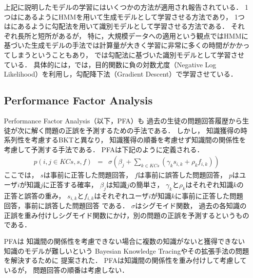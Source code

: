 上記に説明したモデルの学習にはいくつかの方法が適用され報告されている．
1つは\cite{corbett1994knowledge}にあるようにHMMを用いて生成モデルとして学習させる方法であり，
1つは\cite{yudelson2013individualized}にあるように勾配法を用いて識別モデルとして学習させる方法である．
それぞれ長所と短所があるが，
特に，大規模データへの適用という観点ではHMMに基づいた生成モデルの手法では計算量が大きく学習に非常に多くの時間がかかってしまうということもあり，
\cite{yudelson2013individualized}では勾配法に基づいた識別モデルとして学習させている．
具体的には，\cite{yudelson2013individualized}では，目的関数に負の対数尤度（Negative Log Likelihood）を利用し，勾配降下法（Gradient Descent）で学習させている．



\subsection{Performance Factor Analysis}
Performance Factor Analysis\cite{pavlik2009performance}（以下，PFA）も
過去の生徒の問題回答履歴から生徒が次に解く問題の正誤を予測するための手法である．
しかし，
知識獲得の時系列性を考慮するBKTと異なり，
知識獲得の順番を考慮せず知識間の関係性を考慮して予測する手法である．
PFAは下記のように定義される．
\begin{eqnarray}
	p(i, j \in KCs, s, f) & = & \sigma( \beta _j + \sum_{k \in KCs}(\gamma_k s_{i, k} + \rho _k f_{i, k}) )
\end{eqnarray}
ここでは，
$s$は事前に正答した問題回答，
$f$は事前に誤答した問題回答，
$p$はユーザ$i$が知識$j$に正答する確率，
$\beta_j$は知識$j$の簡単さ，
$\gamma_k$と$\rho_k$はそれぞれ知識$k$の正答と誤答の重み，
$s_{i, k}$と$f_{i, k}$はそれぞれユーザ$i$が知識$k$に事前に正答した問題回答，事前に誤答した問題回答
である．
$\sigma$はシグモイド関数，
過去の各知識の正誤を重み付けしシグモイド関数にかけ，別の問題の正誤を予測するというものである．

PFAは
知識間の関係性を考慮できない場合に複数の知識がないと獲得できない知識のモデルが難しいという
Bayesian Knowledge Tracingやその拡張手法の問題を解決するために
提案された．
PFAは知識間の関係性を重み付けして考慮しているが，
問題回答の順番は考慮しない．


